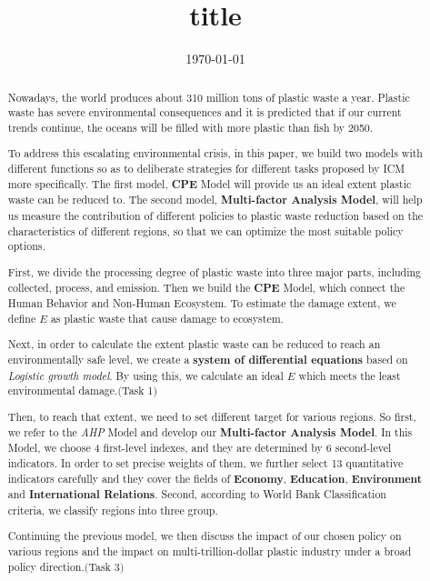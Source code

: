\documentclass{mcmthesis}
\begin{document}
\linespread{0.6} %
\setlength{\parskip}{0.5\baselineskip} %
\title{title}%

\date{\today}
	\begin{abstract}%
		
		Nowadays, the world produces about 310 million tons of plastic waste a year. Plastic waste has severe environmental consequences and it is predicted that if our current trends continue, the oceans will be filled with more plastic than fish by 2050.

		To address this escalating environmental crisis, in this paper, we build two models with different functions so as to deliberate strategies for different tasks proposed by ICM more specifically. The first model, \textbf{CPE} Model will provide us an ideal extent plastic waste can be reduced to. The second model,\textbf{ Multi-factor Analysis Model}, will help us measure the contribution of different policies to plastic waste reduction based on the characteristics of different regions, so that we can optimize the most suitable policy options.

		First, we divide the processing degree of plastic waste into three major parts, including collected, process, and emission. Then we build the \textbf{CPE} Model, which connect the Human Behavior and Non-Human Ecosystem. To estimate the damage extent, we define $E$ as plastic waste that cause damage to ecosystem. 
		
		Next, in order to calculate the extent plastic waste can be reduced to reach an environmentally safe level, we create a \textbf{system of differential equations} based on \textit{Logistic growth model}. By using this, we calculate an ideal $E$ which meets the least environmental damage.$($Task 1$)$
		
		Then, to reach that extent, we need to set different target for various regions. So first, we refer to the \textit{AHP} Model and develop our \textbf{ Multi-factor Analysis Model}. In this Model, we choose 4 first-level indexes, and they are determined by 6 second-level indicators. In order to set precise weights of them, we further select 13 quantitative indicators carefully and they cover the fields of \textbf{Economy}, \textbf{Education}, \textbf{Environment} and \textbf{International Relations}. Second, according to World Bank Classification criteria, we classify regions into three group.
		
		Continuing the previous model, we then discuss the impact of our chosen policy on various regions and the impact on multi-trillion-dollar plastic industry under a broad policy direction.$($Task 3$)$


\end{abstract}
\end{document}
